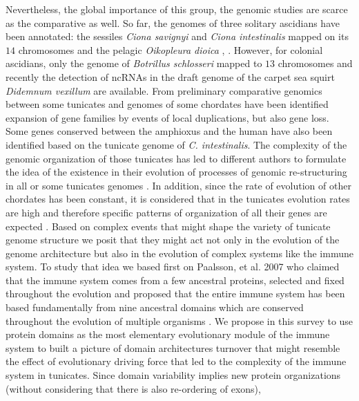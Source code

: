 \documentclass[11pt]{article}
\begin{document}
Nevertheless, the global importance of this group, the genomic studies are 
scarce as the comparative as well. So far, the genomes of three solitary 
ascidians have been annotated: the sessiles \textit{Ciona savignyi} and 
\textit{Ciona intestinalis} mapped on its $14$ chromosomes \cite{dehal2002draft, 
small2007haplome} and the pelagic \textit {Oikopleura dioica} 
\cite{denoeud2010plasticity}, \cite{seo2001miniature}. However, for colonial 
ascidians, only the genome of \textit{Botrillus schlosseri} mapped to $13$ 
chromosomes \cite{voskoboynik2013genome} and recently the detection of ncRNAs in 
the draft genome of the carpet sea squirt \textit{Didemnum vexillum} 
\cite{velandia2016a} are available.  From preliminary comparative genomics 
between some tunicates and genomes of some chordates have been identified 
expansion of gene families by events of local duplications, but also gene loss. 
Some genes conserved between the amphioxus and the human have also been 
identified based on the tunicate genome of \textit{C. intestinalis}. The 
complexity of the genomic organization of those tunicates has led to different 
authors to formulate the idea of the existence in their evolution of processes 
of genomic re-structuring in all or some tunicates genomes 
\cite{putnam2008amphioxus}. In addition, since the rate of evolution of other 
chordates has been constant, it is considered that in the tunicates evolution 
rates are high and therefore specific patterns of organization of all their 
genes are expected \cite{putnam2008amphioxus, berna2014evolutionary}. Based on 
complex events that might shape the variety of tunicate genome structure we 
posit that they might act not only in the evolution of the genome architecture 
but also in the evolution of complex systems like the immune system. To study 
that idea we based first on Paalsson, et al. 2007 who claimed that the immune 
system comes from a few ancestral proteins, selected and fixed throughout the 
evolution and proposed that the entire immune system has been based 
fundamentally from nine ancestral domains which are conserved throughout the 
evolution of multiple organisms \cite{paalsson2007building}. We propose in this 
survey to use protein domains as the most elementary evolutionary module of the 
immune system to built a picture of domain architectures turnover that might 
resemble the effect of evolutionary driving force that led to the complexity of 
the immune system in tunicates. Since domain variability implies new protein 
organizations (without considering that there is also re-ordering of exons), 
\end{document}
